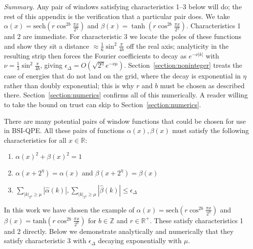 \documentclass[aps,floatfix,10pt,amssymb,amsfont,amsmath,superscriptaddress,float,nofootinbib,longbibliography,nobalancelastpage,twocolumn]{revtex4-2}
\begin{document}
\emph{Summary.} Any pair of windows satisfying characteristics 1--3 below will do; the rest of this appendix is the verification that a particular pair does. We take $\alpha(x) = \mathrm{sech}(r\cos^{2b}\frac{\pi x}{2^{\eta}})$ and $\beta(x) = \tanh(r\cos^{2b}\frac{\pi x}{2^{\eta}})$. Characteristics 1 and 2 are immediate. For characteristic 3 we locate the poles of these functions and show they sit a distance $\approx\frac16\sin^2\frac{\pi}{4b}$ off the real axis; analyticity in the resulting strip then forces the Fourier coefficients to decay as $e^{-\nu|k|}$ with $\nu = \frac13\sin^2\frac{\pi}{4b}$, giving $\epsilon_{\Delta} = O(\sqrt{2^{\eta}}e^{-\nu\mu})$. Section~\ref{section:noninteger} treats the case of energies that do not land on the grid, where the decay is exponential in $\eta$ rather than doubly exponential; this is why $r$ and $b$ must be chosen as described there. Section~\ref{section:numerics} confirms all of this numerically. A reader willing to take the bound on trust can skip to Section~\ref{section:numerics}.

There are many potential pairs of window functions that could be chosen for use in BSI-QPE. All these pairs of functions $\alpha(x), \beta(x)$ must satisfy the following characteristics for all $x \in \mathbb{R}$:
\begin{enumerate}
    \item $\alpha(x)^2+\beta(x)^2 =1$
    \item $\alpha(x+2^{\eta}) = \alpha(x)$ and $\beta(x+2^{\eta}) = \beta(x)$
    \item $\sum_{|k|_{2^{\eta}}\geq\mu}|\hat \alpha(k)|, \sum_{|k|_{2^{\eta}}\geq\mu}|\hat \beta(k)| \leq \epsilon_\Delta$
\end{enumerate}
In this work we have chosen the example of $\alpha(x) = \text{sech}( r\cos^{2b} \frac{\pi x}{2^{\eta}})$ and $\beta(x) = \text{tanh}(r \cos^{2b} \frac{\pi x}{2^{\eta}})$ for $b \in \mathbb{Z}$ and $r \in \mathbb{R}^+$. These satisfy characteristics 1 and 2 directly. Below we demonstrate analytically and numerically that they satisfy characteristic 3 with $\epsilon_{\Delta}$ decaying exponentially with $\mu$.
\end{document}
